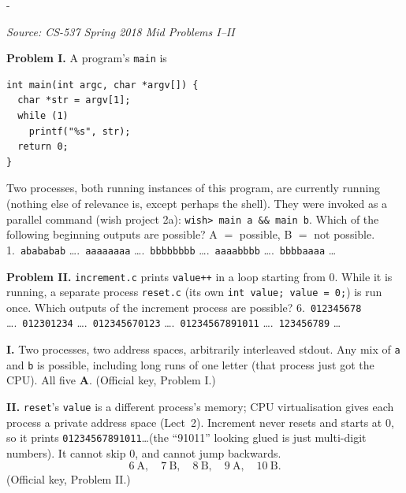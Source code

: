 \documentclass[11pt,a4paper]{article}
\makeatletter
\newcommand{\keepspace}[1]{\par\penalty-100\begingroup
  \setlength{\dimen@}{#1}\dimen@ii\pagegoal\advance\dimen@ii-\pagetotal
  \ifdim\dimen@>\dimen@ii\ifdim\dimen@ii>\z@\vfil\fi\break\fi\endgroup}
\newcounter{qn}[section]
\newenvironment{Qn}[4]{%
  \refstepcounter{qn}\keepspace{7\baselineskip}%
  \begin{tcolorbox}[qboxstyle, title={Q\thesection.\theqn\ \ [#1 \textbar\ #2]\ \ #4}]%
  {\footnotesize\color{g3}\textit{Source: #3}}\par\smallskip%
}{%
  \end{tcolorbox}%
}
\newenvironment{Sol}{%
  \begin{tcolorbox}[sboxstyle, title={Solution}]%
}{%
  \end{tcolorbox}\vspace{0.35em}%
}
\makeatother
\begin{document}
\begin{Qn}{Easy-Medium}{Lect 2}{CS-537 Spring 2018 Mid Problems I--II}{Two processes printing; a second process cannot reset your globals}
\textbf{Problem I.} A program's \texttt{main} is
\begin{lstlisting}[numbers=none]
int main(int argc, char *argv[]) {
  char *str = argv[1];
  while (1)
    printf("%s", str);
  return 0;
}
\end{lstlisting}
Two processes, both running instances of this program, are currently running (nothing else of relevance is, except perhaps the shell). They were invoked as a parallel command (wish project 2a): \texttt{wish> main a \&\& main b}. Which of the following beginning outputs are possible? A $=$ possible, B $=$ not possible.
1.\ \texttt{abababab} \ldots{}.\ \texttt{aaaaaaaa} \ldots{}.\ \texttt{bbbbbbbb} \ldots{}.\ \texttt{aaaabbbb} \ldots{}.\ \texttt{bbbbaaaa} \ldots

\textbf{Problem II.} \texttt{increment.c} prints \texttt{value++} in a loop starting from 0. While it is running, a separate process \texttt{reset.c} (its own \texttt{int value; value = 0;}) is run once. Which outputs of the increment process are possible?
6.\ \texttt{012345678} \ldots{}.\ \texttt{012301234} \ldots{}.\ \texttt{012345670123} \ldots{}.\ \texttt{01234567891011} \ldots{}.\ \texttt{123456789} \ldots
\end{Qn}
\begin{Sol}
\textbf{I.} Two processes, two address spaces, arbitrarily interleaved stdout. Any mix of \texttt{a} and \texttt{b} is possible, including long runs of one letter (that process just got the CPU). All five \textbf{A}. (Official key, Problem I.)

\textbf{II.} \texttt{reset}'s \texttt{value} is a different process's memory; CPU virtualisation gives each process a private address space (Lect~2). Increment never resets and starts at 0, so it prints \texttt{01234567891011}\ldots (the ``91011'' looking glued is just multi-digit numbers). It cannot skip 0, and cannot jump backwards.
\[
6\ \mathrm{A},\quad 7\ \mathrm{B},\quad 8\ \mathrm{B},\quad 9\ \mathrm{A},\quad 10\ \mathrm{B}.
\]
(Official key, Problem II.)
\end{Sol}
\end{document}
